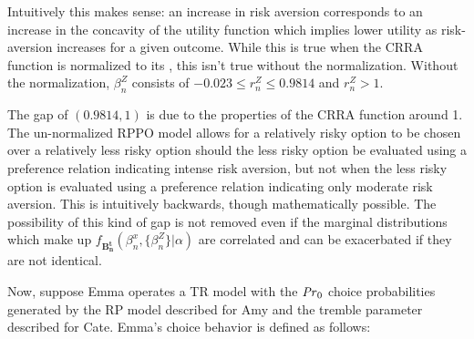 \documentclass[../main.tex]{subfiles}
\begin{document}
Intuitively this makes sense: an increase in risk aversion corresponds to an increase in the concavity of the utility function which implies lower utility as risk-aversion increases for a given outcome.
While this is true when the CRRA function is normalized to its {\CE}, this isn't true without the normalization.
Without the normalization, $\beta_n^Z$ consists of $-0.023 \leq r_n^Z \leq 0.9814$ and $r_n^Z > 1$.

The gap of $(0.9814,1)$ is due to the properties of the CRRA function around 1.
The un-normalized RPPO model allows for a relatively risky option to be chosen over a relatively less risky option should the less risky option be evaluated using a preference relation indicating intense risk aversion, but not when the less risky option is evaluated using a preference relation indicating only moderate risk aversion.
This is intuitively backwards, though mathematically possible.
The possibility of this kind of gap is not removed even if the marginal distributions which make up $f_{\mathbf{B^t_n}}(\beta_n^x,\{\beta_n^Z\}|\alpha)$ are correlated and can be exacerbated if they are not identical.

Now, suppose Emma operates a TR model with the ${\mathit{Pr}}_0$ choice probabilities generated by the RP model described for Amy and the tremble parameter described for Cate.
Emma's choice behavior is defined as follows:
\end{document}
